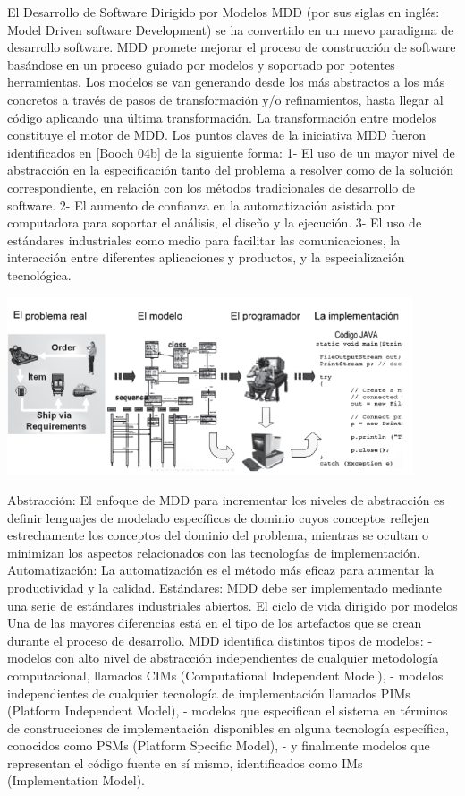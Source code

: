 \begin{flushleft}
\begin{itemize}
El Desarrollo de Software Dirigido por Modelos MDD (por sus siglas en inglés: Model Driven software Development) se ha convertido en un nuevo paradigma de desarrollo software. MDD promete mejorar el proceso de construcción de software basándose en un proceso guiado por modelos y soportado por potentes herramientas.
Los modelos se van generando desde los más abstractos a los más concretos a través de pasos de transformación y/o refinamientos, hasta llegar al código aplicando una última transformación. La transformación entre modelos constituye el motor de MDD.
Los puntos claves de la iniciativa MDD fueron identificados en [Booch 04b] de la siguiente forma: 
1-	El uso de un mayor nivel de abstracción en la especificación tanto del problema a resolver como de la solución correspondiente, en relación con los métodos tradicionales de desarrollo de software. 
2-	El aumento de confianza en la automatización asistida por computadora para soportar el análisis, el diseño y la ejecución. 
3-	El uso de estándares industriales como medio para facilitar las comunicaciones, la interacción entre diferentes aplicaciones y productos, y la especialización tecnológica.

\begin{center}
    \includegraphics[width=12cm]{./Imagenes/mdd3}
    \end{center}

Abstracción: El enfoque de MDD para incrementar los niveles de abstracción es definir lenguajes de modelado específicos de dominio cuyos conceptos reflejen estrechamente los conceptos del dominio del problema, mientras se ocultan o minimizan los aspectos relacionados con las tecnologías de implementación.
Automatización: La automatización es el método más eficaz para aumentar la productividad y la calidad.
Estándares: MDD debe ser implementado mediante una serie de estándares industriales abiertos.
El ciclo de vida dirigido por modelos
Una de las mayores diferencias está en el tipo de los artefactos que se crean durante el proceso de desarrollo.
MDD identifica distintos tipos de modelos: - modelos con alto nivel de abstracción independientes de cualquier metodología computacional, llamados CIMs (Computational Independent Model), - modelos independientes de cualquier tecnología de implementación llamados PIMs (Platform Independent Model), - modelos que especifican el sistema en términos de construcciones de implementación disponibles en alguna tecnología específica, conocidos como PSMs (Platform Specific Model), - y finalmente modelos que representan el código fuente en sí mismo, identificados como IMs (Implementation Model).


\end{itemize}
\end{flushleft}
